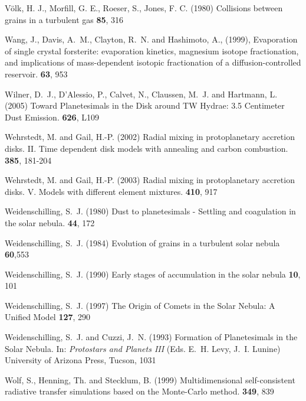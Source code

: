 \begin{literature}
\item
V\"olk, H. J., Morfill, G. E., Roeser, S., Jones, F. C.
(1980) Collisions between grains in a turbulent gas \aap \textbf{85}, 316

\item
Wang, J., Davis, A.~M., Clayton, R.~N. and Hashimoto, A., (1999),
Evaporation of single crystal forsterite: evaporation kinetics, magnesium
isotope fractionation, and implications of mass-dependent isotopic
fractionation of a diffusion-controlled reservoir. \gca \textbf{63}, 953

\item
Wilner, D.~J., D'Alessio, P., Calvet, N., Claussen, M.~J. and Hartmann, L.
(2005) Toward Planetesimals in the Disk around TW Hydrae: 3.5 Centimeter Dust
Emission. \apj \textbf{626}, L109

\item
Wehrstedt, M. and Gail, H.-P. (2002) Radial mixing in protoplanetary accretion
disks. II. Time dependent disk models with annealing and carbon combustion.
\aap \textbf{385}, 181-204 

\item
Wehrstedt, M. and Gail, H.-P. (2003) Radial mixing in protoplanetary accretion
disks. V. Models with different element mixtures. \aap \textbf{410}, 917

\item
Weidenschilling, S.~J. (1980) Dust to planetesimals - Settling and coagulation
in the solar nebula. \ica  \textbf{44}, 172

\item
Weidenschilling, S.~J. (1984) Evolution of grains in a turbulent solar
nebula \ica \textbf{60},553

\item
Weidenschilling, S.~J. (1990) Early stages of accumulation in the solar
nebula
\adsr \textbf{10}, 101

\item
Weidenschilling, S.~J. (1997) The Origin of Comets in the Solar Nebula: A
Unified Model \ica \textbf{127}, 290

\item
Weidenschilling, S.~J. and Cuzzi, J.~N. (1993) Formation of Planetesimals in
the Solar Nebula. In: \textit{Protostars and Planets III} (Eds. E.~H. Levy,
J.~I.  Lunine) University of Arizona Press, Tucson, 1031

\item
Wolf, S., Henning, Th. and Stecklum, B. (1999) Multidimensional
self-consistent radiative transfer simulations based on the Monte-Carlo
method. \aap \textbf{349}, 839


\end{literature}
